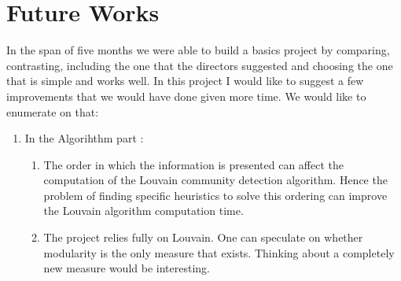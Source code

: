 \section{Future Works}
In the span of five months we were able to build a basics project by comparing, contrasting, including the one that the directors suggested and choosing the one that is simple and works well. In this project I would like to suggest a few improvements that we would have done given more time. We would like to enumerate on that:

\begin{enumerate}
\item In the Algorihthm part :
\begin{enumerate}
\item The order in which the information is presented can affect the computation of the Louvain community detection algorithm. Hence the problem of finding specific heuristics to solve this ordering can improve the Louvain algorithm computation time.
\item 
The project relies fully on Louvain. One can speculate on whether modularity is the only measure that exists. Thinking about a completely new measure would be interesting. 
\end{enumerate}


\end{enumerate}
